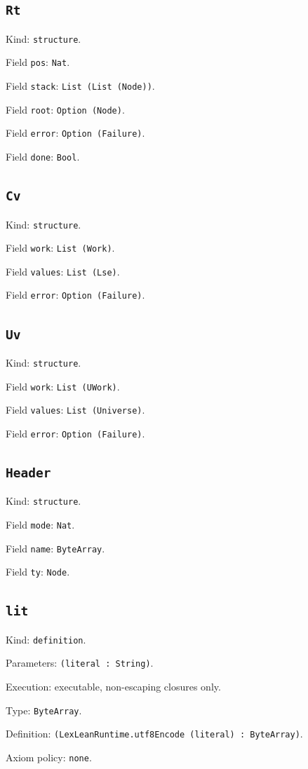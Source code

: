 \documentclass[11pt]{article}
\begin{document}
\subsection*{\texttt{Rt}}
\noindent Kind: \texttt{structure}.\par
\noindent Field \texttt{pos}: \texttt{Nat}.\par
\noindent Field \texttt{stack}: \texttt{List (List (Node))}.\par
\noindent Field \texttt{root}: \texttt{Option (Node)}.\par
\noindent Field \texttt{error}: \texttt{Option (Failure)}.\par
\noindent Field \texttt{done}: \texttt{Bool}.\par
\subsection*{\texttt{Cv}}
\noindent Kind: \texttt{structure}.\par
\noindent Field \texttt{work}: \texttt{List (Work)}.\par
\noindent Field \texttt{values}: \texttt{List (Lse)}.\par
\noindent Field \texttt{error}: \texttt{Option (Failure)}.\par
\subsection*{\texttt{Uv}}
\noindent Kind: \texttt{structure}.\par
\noindent Field \texttt{work}: \texttt{List (UWork)}.\par
\noindent Field \texttt{values}: \texttt{List (Universe)}.\par
\noindent Field \texttt{error}: \texttt{Option (Failure)}.\par
\subsection*{\texttt{Header}}
\noindent Kind: \texttt{structure}.\par
\noindent Field \texttt{mode}: \texttt{Nat}.\par
\noindent Field \texttt{name}: \texttt{ByteArray}.\par
\noindent Field \texttt{ty}: \texttt{Node}.\par
\subsection*{\texttt{lit}}
\noindent Kind: \texttt{definition}.\par
\noindent Parameters: \texttt{(literal : String)}.\par
\noindent Execution: executable, non-escaping closures only.\par
\noindent Type: \texttt{ByteArray}.\par
\noindent Definition: \texttt{(LexLeanRuntime.utf8Encode (literal) : ByteArray)}.\par
\noindent Axiom policy: \texttt{none}.\par
\end{document}
